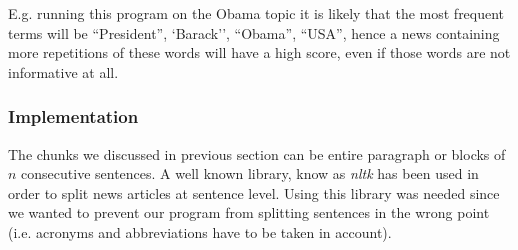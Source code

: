E.g. running this program on the Obama topic it is likely that the most
frequent terms will be ``President'', `Barack'', ``Obama'', ``USA'', hence a
news containing more repetitions of these words will have a high score, even if
those words are not informative at all.

\subsubsection*{Implementation}
The chunks we discussed in previous section can be entire paragraph or blocks of
$n$ consecutive sentences. A well known library, know as \emph{nltk}\cite{nltk} has been used in order to
split news articles at sentence level. Using this library was needed since we wanted
to prevent our program from splitting sentences in the wrong point (i.e.
acronyms and abbreviations have to be taken in account).

